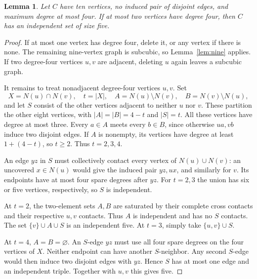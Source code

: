 \documentclass[11pt]{article}
\newtheorem{lemma}[theorem]{Lemma}
\theoremstyle{remark}
\begin{document}
\begin{lemma}\label{lem:ten-complement}
Let $C$ have ten vertices, no induced pair of disjoint edges, and
maximum degree at most four. If at most two vertices have degree
four, then $C$ has an independent set of size five.
\end{lemma}
\begin{proof}
If at most one vertex has degree four, delete it, or any vertex if
there is none. The remaining nine-vertex graph is subcubic, so
Lemma~\ref{lem:nine} applies. If two degree-four vertices $u,v$
are adjacent, deleting $u$ again leaves a subcubic graph.

It remains to treat nonadjacent degree-four vertices $u,v$. Set
\[
 X=N(u)\cap N(v),\quad t=|X|,\quad
 A=N(u)\setminus N(v),\quad B=N(v)\setminus N(u),
\]
and let $S$ consist of the other vertices adjacent to neither $u$ nor $v$.
These partition the other eight vertices, with
$|A|=|B|=4-t$ and $|S|=t$. All these vertices have degree at most
three. Every $a\in A$ meets every $b\in B$, since otherwise
$ua,vb$ induce two disjoint edges. If $A$ is nonempty, its vertices
have degree at least $1+(4-t)$, so $t\ge2$. Thus $t=2,3,4$.

An edge $yz$ in $S$ must collectively contact every vertex of
$N(u)\cup N(v)$: an uncovered $x\in N(u)$ would give the induced
pair $yz,ux$, and similarly for $v$. Its endpoints have at most
four spare degrees after $yz$. For $t=2,3$ the union has six or
five vertices, respectively, so $S$ is independent.

At $t=2$, the two-element sets $A,B$ are saturated by their
complete cross contacts and their respective $u,v$ contacts.
Thus $A$ is independent and has no $S$ contacts. The set
$\{v\}\cup A\cup S$ is an independent five. At $t=3$, simply
take $\{u,v\}\cup S$.

At $t=4$, $A=B=\varnothing$. An $S$-edge $yz$ must use all
four spare degrees on the four vertices of $X$. Neither endpoint
can have another $S$-neighbor. Any second $S$-edge would then
induce two disjoint edges with $yz$. Hence $S$ has at most one
edge and an independent triple. Together with $u,v$ this gives five.
\end{proof}
\end{document}
